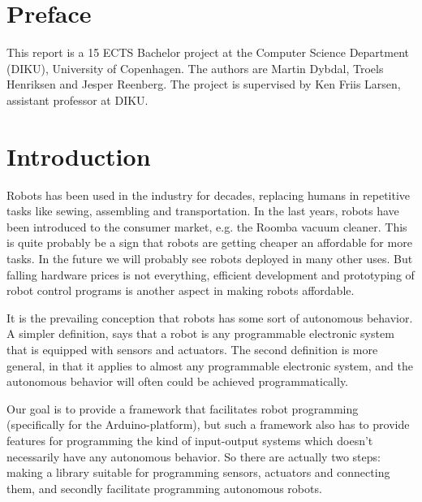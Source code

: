 \documentclass[a4paper, oneside, final]{memoir}
\begin{document}
\chapter{Preface}
This report is a 15 ECTS Bachelor project at the Computer Science
Department (DIKU), University of Copenhagen. The authors are Martin
Dybdal, Troels Henriksen and Jesper Reenberg. The project is
supervised by Ken Friis Larsen, assistant professor at DIKU.



\chapter{Introduction}

Robots has been used in the industry for decades, replacing humans in
repetitive tasks like sewing, assembling and transportation. In the
last years, robots have been introduced to the consumer market,
e.g. the Roomba vacuum cleaner. This is quite probably be a sign that
robots are getting cheaper an affordable for more tasks. In the future
we will probably see robots deployed in many other uses. But falling
hardware prices is not everything, efficient development and
prototyping of robot control programs is another aspect in making
robots affordable. 

It is the prevailing conception that robots has some sort of
autonomous behavior. A simpler definition, says that a robot is any
programmable electronic system that is equipped with sensors and
actuators. The second definition is more general, in that it applies
to almost any programmable electronic system, and the autonomous
behavior will often could be achieved programmatically. 


Our goal is to provide a framework that facilitates robot programming
(specifically for the Arduino-platform), but such a framework also has
to provide features for programming the kind of input-output systems
which doesn't necessarily have any autonomous behavior. So there are
actually two steps: making a library suitable for programming sensors,
actuators and connecting them, and secondly facilitate programming
autonomous robots.
\end{document}
